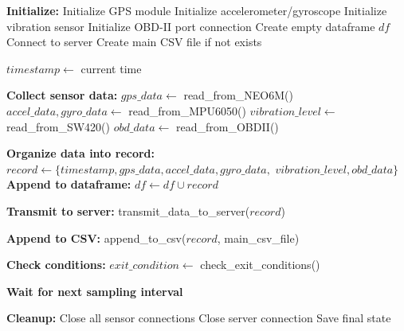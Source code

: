 \documentclass[conference]{IEEEtran}
\begin{document}
\begin{algorithm}
    \caption{IoT Sensor Data Collection and Transmission}
    \begin{algorithmic}[1]
    \State \textbf{Initialize:}
    \State \quad Initialize GPS module
    \State \quad Initialize accelerometer/gyroscope
    \State \quad Initialize vibration sensor
    \State \quad Initialize OBD-II port connection
    \State \quad Create empty dataframe $df$
    \State \quad Connect to server
    \State \quad Create main CSV file if not exists
    
        \State $timestamp \gets$ current time
        
        \State \textbf{Collect sensor data:}
        \State \quad $gps\_data \gets$ read\_from\_NEO6M()
        \State \quad $accel\_data, gyro\_data \gets$ read\_from\_MPU6050()
        \State \quad $vibration\_level \gets$ read\_from\_SW420()
        \State \quad $obd\_data \gets$ read\_from\_OBDII()
        
        \State \textbf{Organize data into record:}
        \State \quad $record \gets \{timestamp, gps\_data, accel\_data, gyro\_data,$
        \State \quad $vibration\_level, obd\_data\}$
        \State \textbf{Append to dataframe:}
        \State \quad $df \gets df \cup record$
        
        \State \textbf{Transmit to server:}
        \State \quad transmit\_data\_to\_server($record$)
        
        \State \textbf{Append to CSV:}
        \State \quad append\_to\_csv($record$, main\_csv\_file)
        
        \State \textbf{Check conditions:}
        \State \quad $exit\_condition \gets$ check\_exit\_conditions()
        
        \State \textbf{Wait for next sampling interval}
    \EndWhile
    
    \State \textbf{Cleanup:}
    \State \quad Close all sensor connections
    \State \quad Close server connection
    \State \quad Save final state
    \end{algorithmic}
\end{algorithm}
\end{document}
